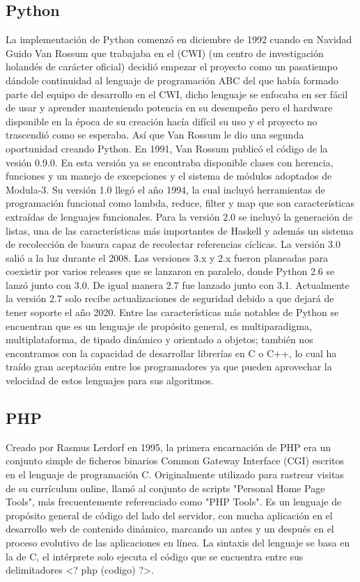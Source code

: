 \documentclass[twoside,twocolumn]{article}
\begin{document}
\subsection{Python}
La implementación de Python comenzó en diciembre de 1992 cuando en Navidad Guido Van Rossum que trabajaba en el (CWI) (un centro de investigación holandés de carácter oficial) decidió empezar el proyecto como un pasatiempo dándole continuidad al lenguaje de programación ABC del que había formado parte del equipo de desarrollo en el CWI, dicho lenguaje se enfocaba en ser fácil de usar y aprender manteniendo potencia en su desempeño pero el hardware disponible en la época de su creación hacía difícil su uso y el proyecto no trascendió como se esperaba. Así que Van Rossum le dio una segunda oportunidad creando Python. En 1991, Van Rossum publicó el código de la vesión 0.9.0. En esta versión ya se encontraba disponible clases con herencia, funciones y un manejo de excepciones y el sistema de módulos adoptados de Modula-3. Su versión 1.0 llegó el año 1994, la cual incluyó herramientas de programación funcional como lambda, reduce, filter y map que son características extraídas de lenguajes funcionales. Para la versión 2.0 se incluyó la generación de listas, una de las características más importantes de Haskell y además un sistema de recolección de basura capaz de recolectar referencias cíclicas. La versión 3.0 salió a la luz durante el 2008. Las versiones 3.x y 2.x fueron planeadas para coexistir por varios releases que se lanzaron en paralelo, donde Python 2.6 se lanzó junto con 3.0. De igual manera 2.7 fue lanzado junto con 3.1. Actualmente la versión 2.7 solo recibe actualizaciones de seguridad debido a que dejará de tener soporte el año 2020. Entre las características más notables de Python se encuentran que es un lenguaje de propósito general, es multiparadigma, multiplataforma, de tipado dinámico y orientado a objetos; también nos encontramos con la capacidad de desarrollar librerías en C o C++, lo cual ha traído gran aceptación entre los programadores ya que pueden aprovechar la velocidad de estos lenguajes para sus algoritmos.

\subsection{PHP}

Creado por Rasmus Lerdorf en 1995, la primera encarnación de PHP era un conjunto simple de ficheros binarios Common Gateway Interface (CGI) escritos en el lenguaje de programación C. Originalmente utilizado para rastrear visitas de su currículum online, llamó al conjunto de scripts "Personal Home Page Tools", más frecuentemente referenciado como "PHP Tools". Es un lenguaje de propósito general de código del lado del servidor, con mucha aplicación en el desarrollo web de contenido dinámico, marcando un antes y un después en el proceso evolutivo de las aplicaciones en línea. La sintaxis del lenguaje se basa en la de C, el intérprete solo ejecuta el código que se encuentra entre sus delimitadores <? php (codigo) ?>. 
\end{document}
